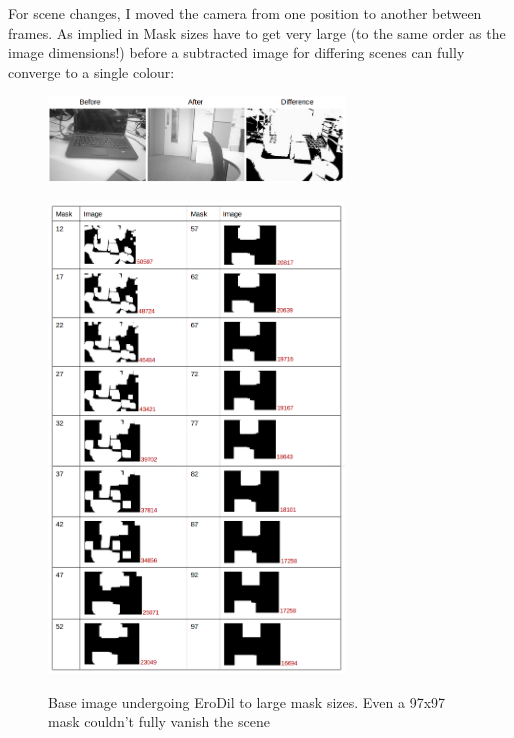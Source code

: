 For scene changes, I moved the camera from one position to another between frames. As implied in Mask sizes have to get very large (to the same order as the image dimensions!) before a subtracted image for differing scenes can  fully converge to a single colour:

\begin{figure}[H]
        \vspace{-20pt}
        \begin{center}
                \includegraphics[width=0.7\textwidth]{../images/ImageOps/Diff1}
                \label{img:diff1}
        \end{center}
        \vspace{-20pt}
        \begin{center}
                \includegraphics[width=0.7\textwidth]{../images/ImageOps/Diff2}
                \label{img:diff2}
        \end{center}
        \vspace{-20pt}
        \caption{Base image undergoing EroDil to large mask sizes. Even a 97x97 mask couldn’t fully vanish the scene}
	\vspace{-40pt}
\end{figure}

